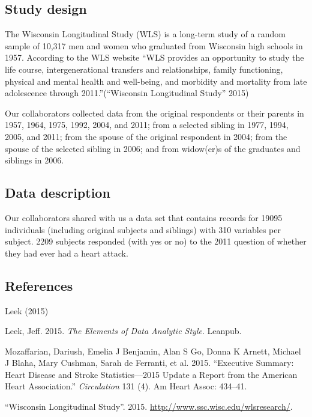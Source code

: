 \documentclass[11pt,]{article}
\begin{document}
\subsection{Study design}\label{study-design}

The Wisconsin Longitudinal Study (WLS) is a long-term study of a random
sample of 10,317 men and women who graduated from Wisconsin high schools
in 1957. According to the WLS website ``WLS provides an opportunity to
study the life course, intergenerational transfers and relationships,
family functioning, physical and mental health and well-being, and
morbidity and mortality from late adolescence through
2011.''(``Wisconsin Longitudinal Study'' 2015)


Our collaborators collected data from the original respondents or their
parents in 1957, 1964, 1975, 1992, 2004, and 2011; from a selected
sibling in 1977, 1994, 2005, and 2011; from the spouse of the original
respondent in 2004; from the spouse of the selected sibling in 2006; and
from widow(er)s of the graduates and siblings in 2006.

\subsection{Data description}\label{data-description}

Our collaborators shared with us a data set that contains records for
19095 individuals (including original subjects and siblings) with 310
variables per subject. 2209 subjects responded (with yes or no) to the
2011 question of whether they had ever had a heart attack.

\subsection{References}\label{references}

Leek (2015)

Leek, Jeff. 2015. \emph{The Elements of Data Analytic Style}. Leanpub.

Mozaffarian, Dariush, Emelia J Benjamin, Alan S Go, Donna K Arnett,
Michael J Blaha, Mary Cushman, Sarah de Ferranti, et al. 2015.
``Executive Summary: Heart Disease and Stroke Statistics---2015 Update a
Report from the American Heart Association.'' \emph{Circulation} 131
(4). Am Heart Assoc: 434--41.

``Wisconsin Longitudinal Study''. 2015.
\url{http://www.ssc.wisc.edu/wlsresearch/}.
\end{document}
